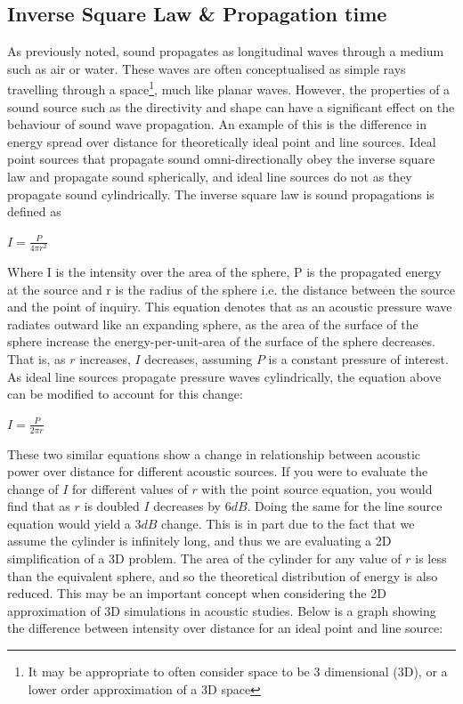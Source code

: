 \subsection{Inverse Square Law \& Propagation time}
As previously noted, sound propagates as longitudinal waves through a medium such as air or water. These waves are often conceptualised as simple rays~\cite{beranek1954acoustics} travelling through a space\footnote{It may be appropriate to often consider space to be 3 dimensional (3D), or a lower order approximation of a 3D space}, much like planar waves. However, the properties of a sound source such as the directivity and shape can have a significant effect on the behaviour of sound wave propagation. An example of this is the difference in energy spread over distance for theoretically ideal point and line sources. Ideal point sources that propagate sound omni-directionally obey the inverse square law and propagate sound spherically, and ideal line sources do not as they propagate sound cylindrically. The inverse square law is sound propagations is defined as~\cite{Davis2014}\\
\begin{center}
$I = \frac{P}{4 \pi r^2}$\\
\end{center}
Where I is the intensity over the area of the sphere, P is the propagated energy at the source and r is the radius of the sphere i.e. the distance between the source and the point of inquiry. This equation denotes that as an acoustic pressure wave radiates outward like an expanding sphere, as the area of the surface of the sphere increase the energy-per-unit-area of the surface of the sphere decreases. That is, as $r$ increases, $ I $ decreases, assuming $ P $ is a constant pressure of interest.\\
As ideal line sources propagate pressure waves cylindrically, the equation above can be modified to account for this change:\\
\begin{center}
$I = \frac{P}{2 \pi r}$\\
\end{center}
These two similar equations show a change in relationship between acoustic power over distance for different acoustic sources. If you were to evaluate the change of $I$ for different values of $r$ with the point source equation, you would find that as $r$ is doubled $I$ decreases by $6dB$. Doing the same for the line source equation would yield a $3dB$ change. This is in part due to the fact that we assume the cylinder is infinitely long, and thus we are evaluating a 2D simplification of a 3D problem. The area of the cylinder for any value of $r$ is less than the equivalent sphere, and so the theoretical distribution of energy is also reduced. This may be an important concept when considering the 2D approximation of 3D simulations in acoustic studies. Below is a graph showing the difference between intensity over distance for an ideal point and line source:\\

